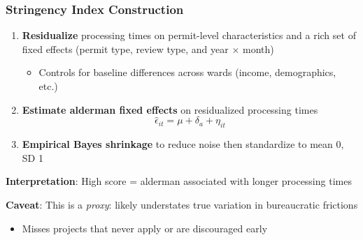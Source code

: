 \begin{frame}
	\frametitle{Stringency Index Construction}
	\begin{enumerate}
		\item \textbf{Residualize} processing times on permit-level characteristics and a rich set of fixed effects (permit type, review type, and year $\times$ month)
		\begin{itemize}
			\item Controls for baseline differences across wards (income, demographics, etc.)
		\end{itemize}
		\item \textbf{Estimate alderman fixed effects} on residualized processing times
		\[
			\widehat{\epsilon}_{it} = \mu + \delta_a + \eta_{it}
		\]
		\vspace{-0.5em}
		\item \textbf{Empirical Bayes shrinkage} to reduce noise {\scriptsize \citep{kline_systemic_2022,kline_discrimination_2024}} then standardize to mean 0, SD 1
	\end{enumerate}
	
	\vspace{0.5em}
	\textbf{Interpretation}: High score = alderman associated with longer processing times
	
	\vspace{0.3em}
	\textbf{Caveat}: This is a \textit{proxy}: likely understates true variation in bureaucratic frictions 
	\begin{itemize}
		\item Misses projects that never apply or are discouraged early
	\end{itemize}
\end{frame}


